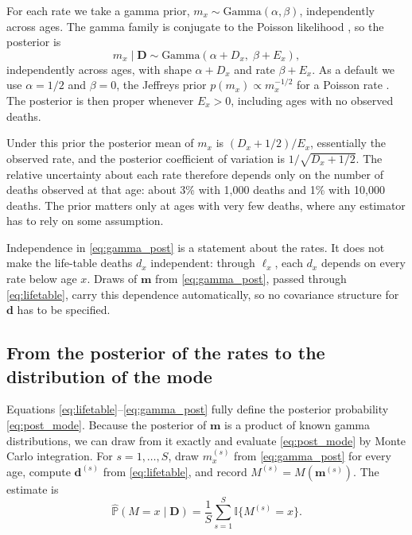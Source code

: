 \documentclass[12pt, letterpaper]{article}
\begin{document}
For each rate we take a gamma prior, $m_x \sim \text{Gamma}(\alpha, \beta)$, independently across ages. The gamma family is conjugate to the Poisson likelihood \citep{gelman1995bayesian}, so the posterior is
\begin{equation}
m_x \mid \bm{D} \sim \text{Gamma}(\alpha + D_x, \; \beta + E_x),
\label{eq:gamma_post}
\end{equation}
independently across ages, with shape $\alpha + D_x$ and rate $\beta + E_x$. As a default we use $\alpha = 1/2$ and $\beta = 0$, the Jeffreys prior $p(m_x) \propto m_x^{-1/2}$ for a Poisson rate \citep{gelman1995bayesian}. The posterior is then proper whenever $E_x > 0$, including ages with no observed deaths.

Under this prior the posterior mean of $m_x$ is $(D_x + 1/2)/E_x$, essentially the observed rate, and the posterior coefficient of variation is $1/\sqrt{D_x + 1/2}$. The relative uncertainty about each rate therefore depends only on the number of deaths observed at that age: about 3\% with 1{,}000 deaths and 1\% with 10{,}000 deaths. The prior matters only at ages with very few deaths, where any estimator has to rely on some assumption.

Independence in \eqref{eq:gamma_post} is a statement about the rates. It does not make the life-table deaths $d_x$ independent: through $\ell_x$, each $d_x$ depends on every rate below age $x$. Draws of $\bm{m}$ from \eqref{eq:gamma_post}, passed through \eqref{eq:lifetable}, carry this dependence automatically, so no covariance structure for $\bm{d}$ has to be specified.

\subsection{From the posterior of the rates to the distribution of the mode}
\label{sec:mode_dist}

Equations \eqref{eq:lifetable}--\eqref{eq:gamma_post} fully define the posterior probability \eqref{eq:post_mode}. Because the posterior of $\bm{m}$ is a product of known gamma distributions, we can draw from it exactly and evaluate \eqref{eq:post_mode} by Monte Carlo integration. For $s = 1, \dots, S$, draw $m_x^{(s)}$ from \eqref{eq:gamma_post} for every age, compute $\bm{d}^{(s)}$ from \eqref{eq:lifetable}, and record $M^{(s)} = M(\bm{m}^{(s)})$. The estimate is
\begin{equation}
\widehat{\mathbb{P}}(M = x \mid \bm{D}) = \frac{1}{S} \sum_{s=1}^{S} \mathbb{I}\{M^{(s)} = x\}.
\label{eq:mc}
\end{equation}
\end{document}
